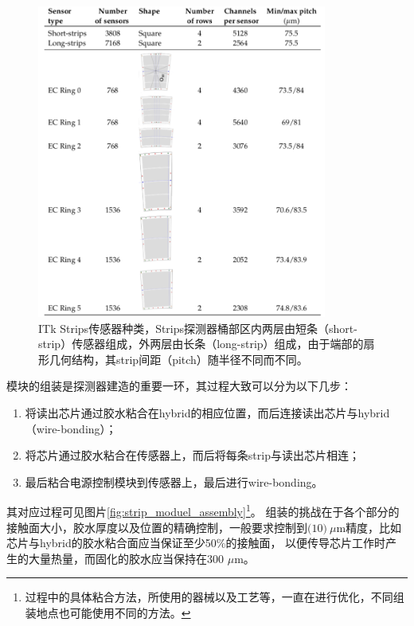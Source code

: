 \begin{figure}[h]
\centering
 \includegraphics[width=0.85\textwidth]{fig/strips_sensor_overview.png}
 \caption{ITk Strips传感器种类\cite{Collaboration:2017mtb}，Strips探测器桶部区内两层由短条（short-strip）传感器组成，外两层由长条（long-strip）组成，由于端部的扇形几何结构，其strip间距（pitch）随半径不同而不同。}
 \label{fig:strip_sensor_overview}
\end{figure}
模块的组装是探测器建造的重要一环，其过程大致可以分为以下几步：
\begin{enumerate}
 \item 将读出芯片通过胶水粘合在hybrid的相应位置，而后连接读出芯片与hybrid（wire-bonding）；
 \item 将芯片通过胶水粘合在传感器上，而后将每条strip与读出芯片相连；
 \item 最后粘合电源控制模块到传感器上，最后进行wire-bonding。
\end{enumerate}
其对应过程可见图片\ref{fig:strip_moduel_assembly}\footnote{过程中的具体粘合方法，所使用的器械以及工艺等，一直在进行优化，不同组装地点也可能使用不同的方法。}。
组装的挑战在于各个部分的接触面大小，胶水厚度以及位置的精确控制，一般要求控制到$\mathcal(10)~\mu\text{m}$精度，比如芯片与hybrid的胶水粘合面应当保证至少50\%的接触面，
以便传导芯片工作时产生的大量热量，而固化的胶水应当保持在300 $\mu\text{m}$。
